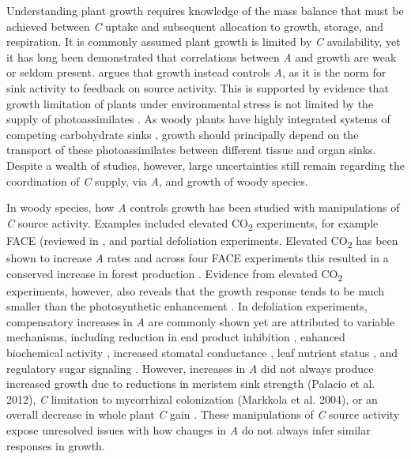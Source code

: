 \documentclass[a4paper]{article}\usepackage[]{graphicx}\usepackage[]{color}
\begin{document}
Understanding plant growth requires knowledge of the mass balance that must be achieved between \textit{C} uptake and subsequent allocation to growth, storage, and respiration. It is commonly assumed plant growth is limited by \textit{C} availability, yet it has long been demonstrated that correlations between \textit{A} and growth are weak or seldom present. \citet{korner2013growth} argues that growth instead controls \textit{A}, as it is the norm for sink activity to feedback on source activity. This is supported by evidence that growth limitation of plants under environmental stress is not limited by the supply of photoassimilates \citep{palacio2014does}. As woody plants have highly integrated systems of competing carbohydrate sinks \citep{kozlowski1992carbohydrate}, growth should principally depend on the transport of these photoassimilates between different tissue and organ sinks. Despite a wealth of studies, however, large uncertainties still remain regarding the coordination of \textit{C} supply, via \textit{A}, and growth of woody species.

In woody species, how \textit{A} controls growth has been studied with manipulations of \textit{C} source activity. Examples included elevated CO\textsubscript{2} experiments, for example FACE (reviewed in  \citet{ainsworth2005have}, and partial defoliation experiments. Elevated CO\textsubscript{2} has been shown to increase \textit{A} rates \citep{drake1997more,ainsworth2007response} and across four FACE experiments this resulted in a conserved increase in forest production \citep{norby2005forest}. Evidence from elevated CO\textsubscript{2} experiments, however, also reveals that the growth response tends to be much smaller than the photosynthetic enhancement \citep{kirschbaum2011does}. In defoliation experiments, compensatory increases in \textit{A} are commonly shown yet are attributed to variable mechanisms, including reduction in end product inhibition \citep{iglesias2002regulation,zhou2003changes,handa2005test}, enhanced biochemical activity \citep{ovaska1993b,layne1995end}, increased stomatal conductance \citep{layne1995end}, leaf nutrient status \citep{turnbull2007increased}, and regulatory sugar signaling \citep{eyles2013whole}. However, increases in \textit{A} did not always produce increased growth due to reductions in meristem sink strength (Palacio et al. 2012), \textit{C} limitation to mycorrhizal colonization (Markkola et al. 2004), or an overall decrease in whole plant \textit{C} gain \citep{ovaska1993a}. These manipulations of \textit{C} source activity expose unresolved issues with how changes in \textit{A} do not always infer similar responses in growth.
\end{document}

